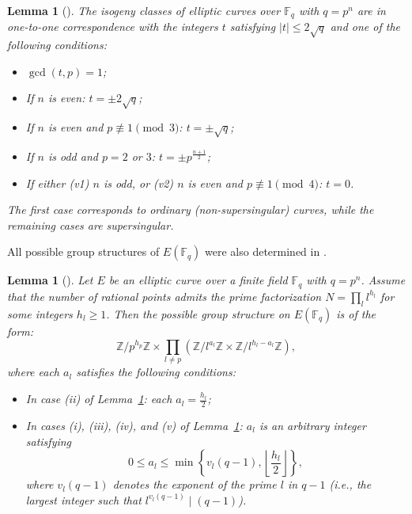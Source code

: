 \documentclass[journal,12pt,onecolumn]{IEEEtran}
\newtheorem{lemma}[theorem]{Lemma}
\begin{document}
\begin{lemma}[{\cite[Theorem 4.1]{MR265369}}]\label{lem:the_class_of_elliptic_curve}
 The isogeny classes of elliptic curves over $\mathbb{F}_q$ with $q = p^n$ are in one-to-one correspondence with the integers $t$ satisfying $|t| \le 2\sqrt{q}$ and one of the following conditions:
\begin{itemize}
    \item[(i)] $\gcd(t, p) = 1$;
    \item[(ii)] If $n$ is even: $t = \pm 2\sqrt{q}$;
    \item[(iii)] If $n$ is even and $p \not\equiv 1 \pmod{3}$: $t = \pm \sqrt{q}$;
    \item[(iv)] If $n$ is odd and $p = 2$ or $3$: $t = \pm p^{\frac{n+1}{2}}$;
    \item[(v)] If either (v1) $n$ is odd, or (v2) $n$ is even and $p \not\equiv 1 \pmod{4}$: $t = 0$.
\end{itemize}
The first case corresponds to ordinary (non-supersingular) curves, while the remaining cases are supersingular.
\end{lemma}

All possible group structures of $E(\mathbb{F}_q)$ were also determined in \cite{MR890272}.

\begin{lemma}[{\cite[Theorem 3]{MR890272}}]\label{lem:the_structure_of_group}
 Let $E$ be an elliptic curve over a finite field $\mathbb{F}_q$ with $q = p^n$. Assume that the number of rational points admits the prime factorization $N = \prod_l l^{h_l}$ for some integers $ h_l \geq 1 $.
 Then the possible group structure on $E(\mathbb{F}_q)$ is of the form:
\[
\mathbb{Z} / p^{h_p} \mathbb{Z} \times \prod_{l \neq p} \left( \mathbb{Z} / l^{a_l} \mathbb{Z} \times \mathbb{Z} / l^{h_l - a_l} \mathbb{Z} \right),
\]
where each $ a_l $ satisfies the following conditions:
\begin{itemize}
    \item[(a)] In case (ii) of Lemma~\ref{lem:the_class_of_elliptic_curve}: each $a_l = \frac{h_l}{2}$;
    \item[(b)] In cases (i), (iii), (iv), and (v) of Lemma~\ref{lem:the_class_of_elliptic_curve}: $a_l$ is an arbitrary integer satisfying
    \[
    0 \le a_l \le \min \left\{ v_l(q-1), \left\lfloor \frac{h_l}{2} \right\rfloor \right\},
    \]
    where $v_l(q-1)$ denotes the exponent of the prime $l$ in $q-1$ (i.e., the largest integer such that $l^{v_l(q-1)} \mid (q-1)$).
\end{itemize}
\end{lemma}
\end{document}
